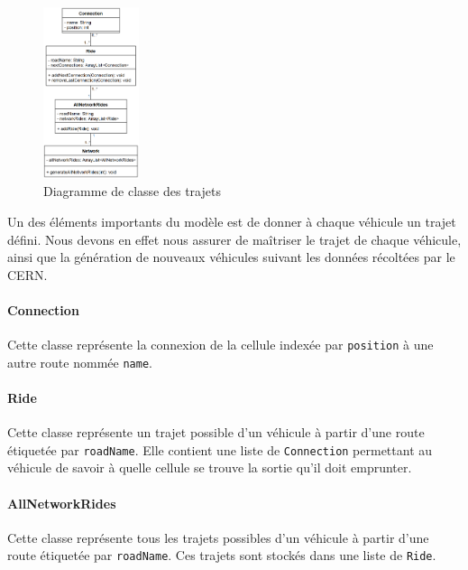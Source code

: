 \documentclass[a4paper,11pt, titlepage]{extarticle}
\begin{document}
\begin{figure}
  \begin{center}
    \includegraphics[width=0.25\textwidth]{rides_diagram.png}
  \end{center}
  \caption{Diagramme de classe des trajets}
  \label{imgRides}
\end{figure}

Un des éléments importants du modèle est de donner à chaque véhicule un trajet défini. Nous devons en effet nous assurer de maîtriser le trajet de chaque véhicule, ainsi que la génération de nouveaux véhicules suivant les données récoltées par le CERN.

\paragraph{Connection}

Cette classe représente la connexion de la cellule indexée par \texttt{position} à une autre route nommée \texttt{name}.

\paragraph{Ride}

Cette classe représente un trajet possible d'un véhicule à partir d'une route étiquetée par \texttt{roadName}. Elle contient une liste de \texttt{Connection} permettant au véhicule de savoir à quelle cellule se trouve la sortie qu'il doit emprunter.

\paragraph{AllNetworkRides}

Cette classe représente tous les trajets possibles d'un véhicule à partir d'une route étiquetée par \texttt{roadName}. Ces trajets sont stockés dans une liste de \texttt{Ride}.
\end{document}
